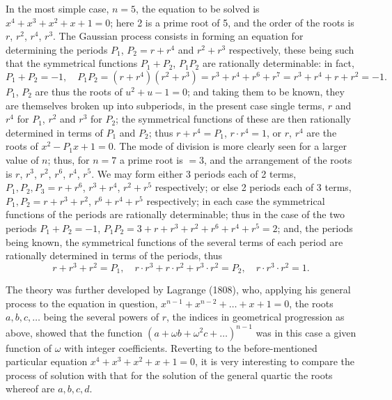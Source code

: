 \documentclass[11pt,a4paper]{article}
\begin{document}
In the most simple case, $n = 5$, the equation to be solved is $x^{4} + x^{3} + x^{2} + x + 1 = 0$; here 2 is a prime root of 5, and the order of the roots is $r$, $r^{2}$, $r^{4}$, $r^{3}$. The Gaussian process consists in forming an equation for determining the periods $P_{1}$, $P_{2} = r + r^{4}$ and $r^{2} + r^{3}$ respectively, these being such that the symmetrical functions $P_{1} + P_{2}$, $P_{1}P_{2}$ are rationally determinable: in fact,
\[
P_{1} + P_{2} = -1, \quad P_{1}P_{2} = (r + r^{4})(r^{2} + r^{3}) = r^{3} + r^{4} + r^{6} + r^{7} = r^{3} + r^{4} + r + r^{2} = -1.
\]
$P_{1}$, $P_{2}$ are thus the roots of $u^{2} + u - 1 = 0$; and taking them to be known, they are themselves broken up into subperiods, in the present case single terms, $r$ and $r^{4}$ for $P_{1}$, $r^{2}$ and $r^{3}$ for $P_{2}$; the symmetrical functions of these are then rationally determined in terms of $P_{1}$ and $P_{2}$; thus $r + r^{4} = P_{1}$, $r \cdot r^{4} = 1$, or $r$, $r^{4}$ are the roots of $x^{2} - P_{1}x + 1 = 0$. The mode of division is more clearly seen for a larger value of $n$; thus, for $n = 7$ a prime root is $= 3$, and the arrangement of the roots is $r$, $r^{3}$, $r^{2}$, $r^{6}$, $r^{4}$, $r^{5}$. We may form either 3 periods each of 2 terms, $P_{1}, P_{2}, P_{3} = r + r^{6}$, $r^{3} + r^{4}$, $r^{2} + r^{5}$ respectively; or else 2 periods each of 3 terms, $P_{1}, P_{2} = r + r^{3} + r^{2}$, $r^{6} + r^{4} + r^{5}$ respectively; in each case the symmetrical functions of the periods are rationally determinable; thus in the case of the two periods $P_{1} + P_{2} = -1$, $P_{1}P_{2} = 3 + r + r^{3} + r^{2} + r^{6} + r^{4} + r^{5} = 2$; and, the periods being known, the symmetrical functions of the several terms of each period are rationally determined in terms of the periods, thus
\[
r + r^{3} + r^{2} = P_{1}, \quad r \cdot r^{3} + r \cdot r^{2} + r^{3} \cdot r^{2} = P_{2}, \quad r \cdot r^{3} \cdot r^{2} = 1.
\]

The theory was further developed by Lagrange (1808), who, applying his general process to the equation in question, $x^{n-1} + x^{n-2} + \ldots + x + 1 = 0$, the roots $a, b, c, \ldots$ being the several powers of $r$, the indices in geometrical progression as above, showed that the function $(a + \omega b + \omega^{2}c + \ldots)^{n-1}$ was in this case a given function of $\omega$ with integer coefficients. Reverting to the before-mentioned particular equation $x^{4} + x^{3} + x^{2} + x + 1 = 0$, it is very interesting to compare the process of solution with that for the solution of the general quartic the roots whereof are $a, b, c, d$.
\end{document}
